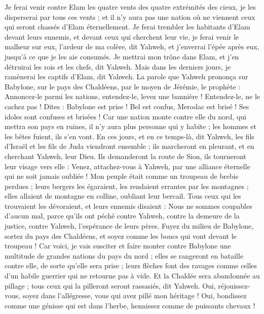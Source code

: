 \begin{multicols}{2}
Je ferai venir contre Elam les quatre vents des quatre extrémités des cieux, je les disperserai par tous ces vents ; et il n'y aura pas une nation où ne viennent ceux qui seront chassés d'Elam éternellement.
Je ferai trembler les habitants d'Elam devant leurs ennemis, et devant ceux qui cherchent leur vie, je ferai venir le malheur sur eux, l'ardeur de ma colère, dit Yahweh, et j'enverrai l'épée après eux, jusqu'à ce que je les aie consumés.
Je mettrai mon trône dans Elam, et j'en détruirai les rois et les chefs, dit Yahweh.
Mais dans les derniers jours, je ramènerai les captifs d'Elam, dit Yahweh.
\VerseOne{}La parole que Yahweh prononça sur Babylone, sur le pays des Chaldéens, par le moyen de Jérémie, le prophète :
Annoncez-le parmi les nations, entendez-le, levez une bannière ! Entendez-le, ne le cachez pas ! Dites : Babylone est prise ! Bel est confus, Merodac est brisé ! Ses idoles sont confuses et brisées !
Car une nation monte contre elle du nord, qui mettra son pays en ruines, il n'y aura plus personne qui y habite ; les hommes et les bêtes fuient, ils s'en vont.
En ces jours, et en ce temps-là, dit Yahweh, les fils d'Israël et les fils de Juda viendront ensemble ; ils marcheront en pleurant, et en cherchant Yahweh, leur Dieu.
Ils demanderont la route de Sion, ils tourneront leur visage vers elle : Venez, attachez-vous à Yahweh, par une alliance éternelle qui ne soit jamais oubliée !
Mon peuple était comme un troupeau de brebis perdues ; leurs bergers les égaraient, les rendaient errantes par les montagnes ; elles allaient de montagne en colline, oubliant leur bercail.
Tous ceux qui les trouvaient les dévoraient, et leurs ennemis disaient : Nous ne sommes coupables d'aucun mal, parce qu'ils ont péché contre Yahweh, contre la demeure de la justice, contre Yahweh, l'espérance de leurs pères.
Fuyez du milieu de Babylone, sortez du pays des Chaldéens, et soyez comme les boucs qui vont devant le troupeau !
Car voici, je vais susciter et faire monter contre Babylone une multitude de grandes nations du pays du nord ; elles se rangeront en bataille contre elle, de sorte qu'elle sera prise ; leurs flèches font des ravages comme celles d'un habile guerrier qui ne retourne pas à vide.
Et la Chaldée sera abandonnée au pillage ; tous ceux qui la pilleront seront rassasiés, dit Yahweh.
Oui, réjouissez-vous, soyez dans l'allégresse, vous qui avez pillé mon héritage ! Oui, bondissez comme une génisse qui est dans l'herbe, hennissez comme de puissants chevaux !

\end{multicols}
